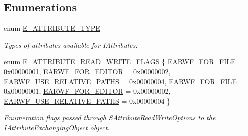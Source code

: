 \subsection*{Enumerations}
\begin{DoxyCompactItemize}
\item 
\mbox{\label{namespaceirr_1_1io_a874a5f14dbe2e45c40c2bb29e9f0ebcb}} 
enum \hyperlink{namespaceirr_1_1io_a874a5f14dbe2e45c40c2bb29e9f0ebcb}{E\+\_\+\+A\+T\+T\+R\+I\+B\+U\+T\+E\+\_\+\+T\+Y\+PE} \begin{DoxyCompactList}\small\item\em Types of attributes available for I\+Attributes. \end{DoxyCompactList}
\item 
enum \hyperlink{namespaceirr_1_1io_a84923cf86af38e49c6ec5ee36903d782}{E\+\_\+\+A\+T\+T\+R\+I\+B\+U\+T\+E\+\_\+\+R\+E\+A\+D\+\_\+\+W\+R\+I\+T\+E\+\_\+\+F\+L\+A\+GS} \{ \newline
\hyperlink{namespaceirr_1_1io_a84923cf86af38e49c6ec5ee36903d782ae55c31c98611b5b9d2e25a6ff9e56d4f}{E\+A\+R\+W\+F\+\_\+\+F\+O\+R\+\_\+\+F\+I\+LE} = 0x00000001, 
\hyperlink{namespaceirr_1_1io_a84923cf86af38e49c6ec5ee36903d782a0764b32e1fa75ed14931f64d8f68d1a5}{E\+A\+R\+W\+F\+\_\+\+F\+O\+R\+\_\+\+E\+D\+I\+T\+OR} = 0x00000002, 
\hyperlink{namespaceirr_1_1io_a84923cf86af38e49c6ec5ee36903d782ae8a96a03827462eab93b5a0b6214e9ca}{E\+A\+R\+W\+F\+\_\+\+U\+S\+E\+\_\+\+R\+E\+L\+A\+T\+I\+V\+E\+\_\+\+P\+A\+T\+HS} = 0x00000004, 
\hyperlink{namespaceirr_1_1io_a84923cf86af38e49c6ec5ee36903d782ae55c31c98611b5b9d2e25a6ff9e56d4f}{E\+A\+R\+W\+F\+\_\+\+F\+O\+R\+\_\+\+F\+I\+LE} = 0x00000001, 
\newline
\hyperlink{namespaceirr_1_1io_a84923cf86af38e49c6ec5ee36903d782a0764b32e1fa75ed14931f64d8f68d1a5}{E\+A\+R\+W\+F\+\_\+\+F\+O\+R\+\_\+\+E\+D\+I\+T\+OR} = 0x00000002, 
\hyperlink{namespaceirr_1_1io_a84923cf86af38e49c6ec5ee36903d782ae8a96a03827462eab93b5a0b6214e9ca}{E\+A\+R\+W\+F\+\_\+\+U\+S\+E\+\_\+\+R\+E\+L\+A\+T\+I\+V\+E\+\_\+\+P\+A\+T\+HS} = 0x00000004
 \}\begin{DoxyCompactList}\small\item\em Enumeration flags passed through S\+Attribute\+Read\+Write\+Options to the I\+Attribute\+Exchanging\+Object object. \end{DoxyCompactList}
\item 
\mbox{\label{namespaceirr_1_1io_a22364f1caf06442a70f6198025af3fe9}} 

\end{DoxyCompactItemize}
